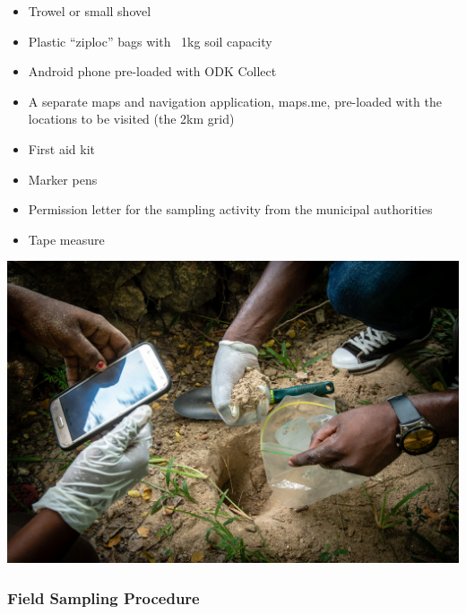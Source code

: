 \documentclass[a4paper,12pt]{article}
\begin{document}
\begin{itemize}
  \item Trowel or small shovel
  \item Plastic ``ziploc'' bags with ~1kg soil capacity
  \item Android phone pre-loaded with ODK Collect
  \item A separate maps and navigation application, maps.me, pre-loaded with the locations to be visited (the 2km grid)
  \item First aid kit
  \item Marker pens
  \item Permission letter for the sampling activity from the municipal authorities
  \item Tape measure
\end{itemize}

\includegraphics[width=\textwidth]{DSC05592.jpg}  

\subsubsection{Field Sampling Procedure}
\end{document}
